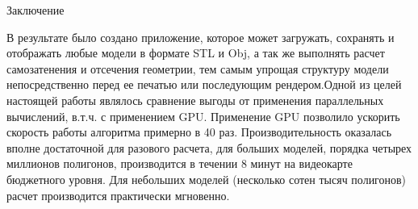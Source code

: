 \clearpage
{}
\begin{flushleft}\Large{Заключение}\end{flushleft}
В результате было создано приложение, которое может загружать, сохранять и отображать любые модели в формате STL и Obj, а так же выполнять расчет самозатенения и отсечения геометрии, тем самым упрощая структуру модели непосредственно перед ее печатью или последующим рендером.Одной из целей настоящей работы являлось сравнение выгоды от применения параллельных вычислений, в.т.ч. с применением GPU. Применение GPU позволило ускорить скорость работы алгоритма примерно в 40 раз. Производительность оказалась вполне достаточной для разового расчета, для больших моделей, порядка четырех миллионов полигонов, производится в течении 8 минут на видеокарте бюджетного уровня. Для небольших моделей (несколько сотен тысяч полигонов) расчет производится практически мгновенно.